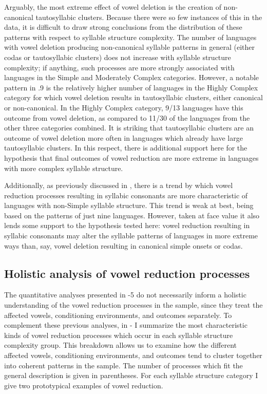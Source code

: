   Arguably, the most extreme effect of vowel deletion is the creation of non-canonical tautosyllabic clusters. Because there were so few instances of this in the data, it is difficult to draw strong conclusions from the distribution of these patterns with respect to syllable structure complexity. The number of languages with vowel deletion producing non-canonical syllable patterns in general (either codas or tautosyllabic clusters) does not increase with syllable structure complexity; if anything, such processes are more strongly associated with languages in the Simple and Moderately Complex categories. However, a notable pattern in .9 is the relatively higher number of languages in the Highly Complex category for which vowel deletion results in tautosyllabic clusters, either canonical or non-canonical. In the Highly Complex category, 9/13 languages have this outcome from vowel deletion, as compared to 11/30 of the languages from the other three categories combined. It is striking that tautosyllabic clusters are an outcome of vowel deletion more often in languages which already have large tautosyllabic clusters. In this respect, there is additional support here for the hypothesis that final outcomes of vowel reduction are more extreme in languages with more complex syllable structure.   

  Additionally, as previously discussed in , there is a trend by which vowel reduction processes resulting in syllabic consonants are more characteristic of languages with non-Simple syllable structure. This trend is weak at best, being based on the patterns of just nine languages. However, taken at face value it also lends some support to the hypothesis tested here: vowel reduction resulting in syllabic consonants may alter the syllable patterns of languages in more extreme ways than, say, vowel deletion resulting in canonical simple onsets or codas.

\subsection{Holistic analysis of vowel reduction processes}\label{sec:6.3.6}

  The quantitative analyses presented in -5 do not necessarily inform a holistic understanding of the vowel reduction processes in the sample, since they treat the affected vowels, conditioning environments, and outcomes separately. To complement these previous analyses, in - I summarize the most characteristic kinds of vowel reduction processes which occur in each syllable structure complexity group. This breakdown allows us to examine how the different affected vowels, conditioning environments, and outcomes tend to cluster together into coherent patterns in the sample. The number of processes which fit the general description is given in parentheses. For each syllable structure category I give two prototypical examples of vowel reduction.

